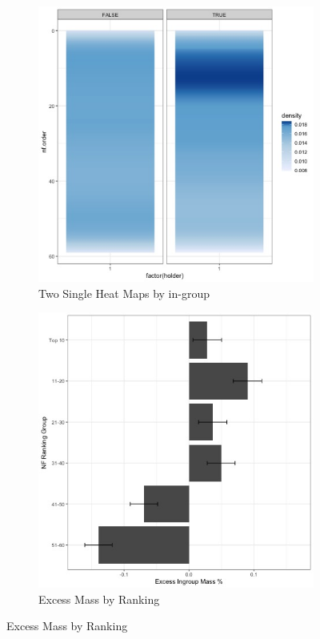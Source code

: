 \documentclass[12pt,letterpaper]{article}
\begin{document}
\begin{figure}[ht]
\caption{NF in-group Posts Higher}
\label{fig:nf_bygroup_india}
    \begin{subfigure}{.5\textwidth} 
        \centering
        \includegraphics[width=1\linewidth]{Output/Graphs/Audit/Heatmaps/India NF nf rank by ingroup - smooth.jpg}  
        \caption{Two Single Heat Maps by in-group}
        \label{fig:nf_bygroup_hm}
        \end{subfigure}
    \begin{subfigure}{.5\textwidth}
        \centering
        \includegraphics[width=.9\linewidth]{Output/Graphs/Audit/Excess Mass/India NF excess mass by ranking group.jpg}  
        \caption{Excess Mass by Ranking}
        \label{fig:nf_bygroup_em_india}
    \end{subfigure}
\end{figure}
\end{document}
